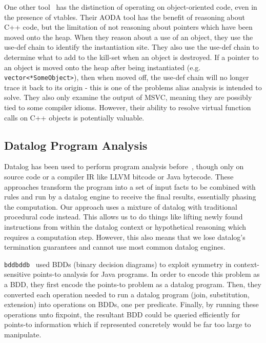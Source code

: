 One other tool~\cite{dewey-uncovering-2015} has the distinction of operating on object-oriented code, even in the presence of vtables.
Their AODA tool has the benefit of reasoning about C++ code, but the limitation of not reasoning about pointers which have been moved onto the heap.
When they reason about a use of an object, they use the use-def chain to identify the instantiation site.
They also use the use-def chain to determine what to add to the kill-set when an object is destroyed.
If a pointer to an object is moved onto the heap after being instantiated (e.g. \texttt{vector<*SomeObject>}), then when moved off, the use-def chain will no longer trace it back to its origin - this is one of the problems alias analysis is intended to solve.
They also only examine the output of MSVC, meaning they are possibly tied to some compiler idioms.
However, their ability to resolve virtual function calls on C++ objects is potentially valuable.

\subsection{Datalog Program Analysis}
Datalog has been used to perform program analysis before~\cite{bddbddb,doop1}, though only on source code or a compiler IR like LLVM bitcode or Java bytecode.
These approaches transform the program into a set of input facts to be combined with rules and run by a datalog engine to receive the final results, essentially phasing the computation.
Our approach uses a mixture of datalog with traditional procedural code instead.
This allows us to do things like lifting newly found instructions from within the datalog context or hypothetical reasoning which requires a computation step.
However, this also means that we lose datalog's termination guarantees and cannot use most common datalog engines.

\texttt{bddbddb}~\cite{bddbddb} used BDDs (binary decision diagrams) to exploit symmetry in context-sensitive points-to analysis for Java programs.
In order to encode this problem as a BDD, they first encode the points-to problem as a datalog program.
Then, they converted each operation needed to run a datalog program (join, substitution, extension) into operations on BDDs, one per predicate.
Finally, by running these operations unto fixpoint, the resultant BDD could be queried efficiently for points-to information which if represented concretely would be far too large to manipulate.

